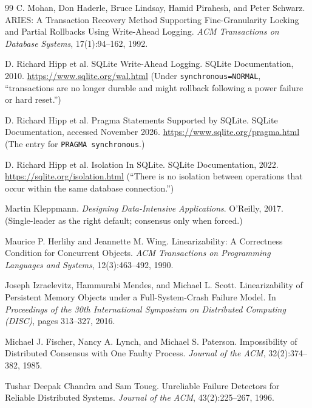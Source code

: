 \documentclass[11pt,a4paper]{article}
\theoremstyle{definition}
\theoremstyle{remark}
\begin{document}
\begin{thebibliography}{99}
C. Mohan, Don Haderle, Bruce Lindsay, Hamid Pirahesh, and Peter Schwarz.
\newblock ARIES: A Transaction Recovery Method Supporting Fine-Granularity Locking and Partial Rollbacks Using Write-Ahead Logging.
\newblock \textit{ACM Transactions on Database Systems}, 17(1):94--162, 1992.

D. Richard Hipp et al.
\newblock SQLite Write-Ahead Logging.
\newblock SQLite Documentation, 2010.
\newblock \url{https://www.sqlite.org/wal.html}
\newblock (Under \texttt{synchronous=NORMAL}, ``transactions are no longer durable and might rollback following a power failure or hard reset.'')

D. Richard Hipp et al.
\newblock Pragma Statements Supported by SQLite.
\newblock SQLite Documentation, accessed November 2026.
\newblock \url{https://www.sqlite.org/pragma.html}
\newblock (The entry for \texttt{PRAGMA synchronous}.)

D. Richard Hipp et al.
\newblock Isolation In SQLite.
\newblock SQLite Documentation, 2022.
\newblock \url{https://sqlite.org/isolation.html}
\newblock (``There is no isolation between operations that occur within the same database connection.'')

Martin Kleppmann.
\newblock \textit{Designing Data-Intensive Applications}.
\newblock O'Reilly, 2017.
\newblock (Single-leader as the right default; consensus only when forced.)

Maurice P. Herlihy and Jeannette M. Wing.
\newblock Linearizability: A Correctness Condition for Concurrent Objects.
\newblock \textit{ACM Transactions on Programming Languages and Systems}, 12(3):463--492, 1990.

Joseph Izraelevitz, Hammurabi Mendes, and Michael L. Scott.
\newblock Linearizability of Persistent Memory Objects under a Full-System-Crash Failure Model.
\newblock In \textit{Proceedings of the 30th International Symposium on Distributed Computing (DISC)}, pages 313--327, 2016.

Michael J. Fischer, Nancy A. Lynch, and Michael S. Paterson.
\newblock Impossibility of Distributed Consensus with One Faulty Process.
\newblock \textit{Journal of the ACM}, 32(2):374--382, 1985.

Tushar Deepak Chandra and Sam Toueg.
\newblock Unreliable Failure Detectors for Reliable Distributed Systems.
\newblock \textit{Journal of the ACM}, 43(2):225--267, 1996.


\end{thebibliography}
\end{document}
